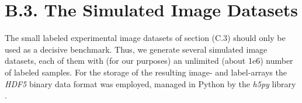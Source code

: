 \documentclass[11pt, a4paper, twoside]{article} %
\begin{document}
\section*{B.3. The Simulated Image Datasets \vspace{-0.1cm}}
The small labeled experimental image datasets of section (C.3) should only be used as a decisive benchmark. Thus, we generate several simulated image datasets, each of them with (for our purposes) an unlimited (about 1e6) number of labeled samples. For the storage of the resulting image- and label-arrays the {\em HDF5} binary data format was employed, managed in Python by the {\em h5py} library \cite{h5f}.\vspace{-0.1cm}
\end{document}
